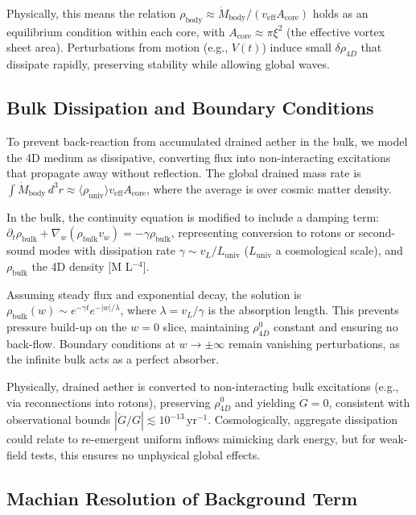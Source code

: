 \documentclass{article}
\begin{document}
Physically, this means the relation $\rho_{\text{body}} \approx \dot{M}_{\text{body}} / (v_{\text{eff}} A_{\text{core}})$ holds as an equilibrium condition within each core, with $A_{\text{core}} \approx \pi \xi^2$ (the effective vortex sheet area). Perturbations from motion (e.g., $V(t)$) induce small $\delta \rho_{4D}$ that dissipate rapidly, preserving stability while allowing global waves.

\subsection{Bulk Dissipation and Boundary Conditions}

To prevent back-reaction from accumulated drained aether in the bulk, we model the 4D medium as dissipative, converting flux into non-interacting excitations that propagate away without reflection. The global drained mass rate is $\int \dot{M}_{\text{body}} \, d^3 r \approx \langle \rho_{\text{univ}} \rangle v_{\text{eff}} A_{\text{core}}$, where the average is over cosmic matter density.

In the bulk, the continuity equation is modified to include a damping term: $\partial_t \rho_{\text{bulk}} + \nabla_w (\rho_{\text{bulk}} v_w) = -\gamma \rho_{\text{bulk}}$, representing conversion to rotons or second-sound modes with dissipation rate $\gamma \sim v_L / L_{\text{univ}}$ ($L_{\text{univ}}$ a cosmological scale), and $\rho_{\text{bulk}}$ the 4D density [M L$^{-4}$].

Assuming steady flux and exponential decay, the solution is $\rho_{\text{bulk}}(w) \sim e^{-\gamma t} e^{-|w| / \lambda}$, where $\lambda = v_L / \gamma$ is the absorption length. This prevents pressure build-up on the $w=0$ slice, maintaining $\rho_{4D}^0$ constant and ensuring no back-flow. Boundary conditions at $w \to \pm \infty$ remain vanishing perturbations, as the infinite bulk acts as a perfect absorber.

Physically, drained aether is converted to non-interacting bulk excitations (e.g., via reconnections into rotons), preserving $\rho_{4D}^0$ and yielding $\dot{G} = 0$, consistent with observational bounds $|\dot{G}/G| \lesssim 10^{-13} \, \mathrm{yr}^{-1}$. Cosmologically, aggregate dissipation could relate to re-emergent uniform inflows mimicking dark energy, but for weak-field tests, this ensures no unphysical global effects.

\subsection{Machian Resolution of Background Term}
\end{document}
